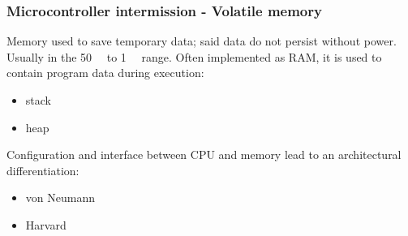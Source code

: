 \documentclass[11pt,xcolor=table,aspectratio=169]{beamer}
\begin{document}
	\begin{frame}
		\frametitle{Microcontroller intermission - Volatile memory}
		Memory used to save temporary data; said data do not persist without power. Usually in the \SI{50}{\kilo\byte} to \SI{1}{\mega\byte} range.
		Often implemented as RAM, it is used to contain program data during execution:
			\begin{itemize}
				\item stack
				\item heap
			\end{itemize}
		\vspace{.2cm}
		Configuration and interface between CPU and memory lead to an architectural differentiation:
		\begin{itemize}
			\item von Neumann
			\item Harvard
		\end{itemize}
	\end{frame}
	
\end{document}
